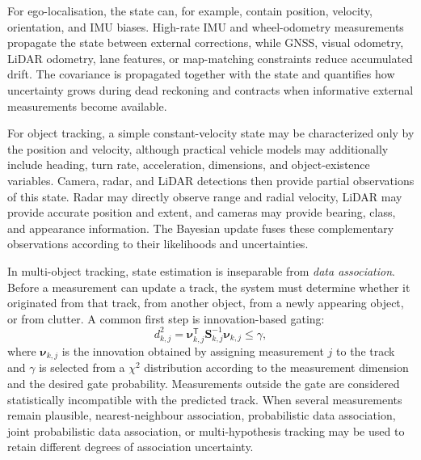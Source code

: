 
For ego-localisation, the state can, for example, contain position,
velocity, orientation, and IMU biases. High-rate IMU and wheel-odometry measurements propagate the state between external corrections, while GNSS, visual odometry, LiDAR
odometry, lane features, or map-matching constraints reduce accumulated drift. The covariance is propagated together with the state and quantifies how uncertainty grows during dead reckoning and contracts when informative external measurements become available.

For object tracking, a simple constant-velocity state may be characterized only by the position and velocity, although practical vehicle models may additionally include heading, turn rate, acceleration, dimensions, and object-existence variables. Camera, radar, and LiDAR detections then provide partial observations of this state. Radar may directly observe range and radial velocity, LiDAR may provide accurate position and extent, and cameras may provide bearing, class, and appearance information. The Bayesian update fuses these complementary observations according to their likelihoods and uncertainties.

In multi-object tracking, state estimation is inseparable from
\emph{data association}. Before a measurement can update a track, the
system must determine whether it originated from that track, from
another object, from a newly appearing object, or from clutter. A common
first step is innovation-based gating:
\begin{equation}
d_{k,j}^{2}
=
\boldsymbol{\nu}_{k,j}^{\mathsf T}
\mathbf{S}_{k,j}^{-1}
\boldsymbol{\nu}_{k,j}
\leq \gamma,
\label{eq:mahalanobis_gate}
\end{equation}
where $\boldsymbol{\nu}_{k,j}$ is the innovation obtained by assigning
measurement $j$ to the track and $\gamma$ is selected from a
$\chi^2$ distribution according to the measurement dimension and the
desired gate probability. Measurements outside the gate are considered
statistically incompatible with the predicted track. When several
measurements remain plausible, nearest-neighbour association,
probabilistic data association, joint probabilistic data association,
or multi-hypothesis tracking may be used to retain different degrees of
association uncertainty.



